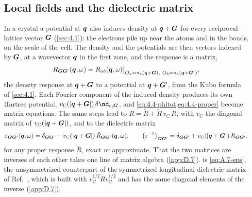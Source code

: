 \subsection{Local fields and the dielectric matrix}

In a crystal a potential at $\bm{q}$ also induces density at $\bm{q} + \bm{G}$ for every reciprocal-lattice vector $\bm{G}$ (\cref{sec:4.1}): the electrons pile up near the atoms and in the bonds, on the scale of the cell. The density and the potentials are then vectors indexed by $\bm{G}$, at a wavevector $\bm{q}$ in the first zone, and the response is a matrix,
\begin{equation}
  R_{\bm{G}\bm{G}'}(\bm{q},\omega) = R_{ab}(\bm{q},\omega)\big|_{O_a = n_e(\bm{q}+\bm{G}),\ O_b = n_e(\bm{q}+\bm{G}')} ,
  \label{eq:4.4-RGG}
\end{equation}
the density response at $\bm{q} + \bm{G}$ to a potential at $\bm{q} + \bm{G}'$, from the Kubo formula of \cref{sec:4.1}. Each Fourier component of the induced density produces its own Hartree potential, $v_{\mathrm{C}}(|\vect{q}+\vect{G}|)\,\delta\nd_{e,\vect{G}}$, and \cref{eq:4.4-phitot,eq:4.4-proper} become matrix equations. The same steps lead to $R = \tilde R + \tilde R\,v_{\mathrm{C}}\,R$, with $v_{\mathrm{C}}$ the diagonal matrix of $v_{\mathrm{C}}(|\bm{q}+\bm{G}|)$, and to the dielectric matrix
\begin{equation}
  \varepsilon_{\bm{G}\bm{G}'}(\bm{q},\omega) = \delta_{\bm{G}\bm{G}'} - v_{\mathrm{C}}(|\bm{q}+\bm{G}|)\,\tilde R_{\bm{G}\bm{G}'}(\bm{q},\omega), \qquad
  \bigl(\varepsilon^{-1}\bigr)_{\bm{G}\bm{G}'} = \delta_{\bm{G}\bm{G}'} + v_{\mathrm{C}}(|\bm{q}+\bm{G}|)\,R_{\bm{G}\bm{G}'} ,
  \label{eq:4.4-epsGG}
\end{equation}
for any proper response $\tilde R$, exact or approximate. That the two matrices are inverses of each other takes one line of matrix algebra (\cref{app:D.7}).  is \cref{eq:A.7-eps}, the unsymmetrized counterpart of the symmetrized longitudinal dielectric matrix of Ref.~\cite[Eqs.~(A5)--(A7)]{knapen2021dark}, which is built with $v_{\mathrm{C}}^{1/2}\tilde Rv_{\mathrm{C}}^{1/2}$ and has the same diagonal elements of the inverse (\cref{app:D.7}).

